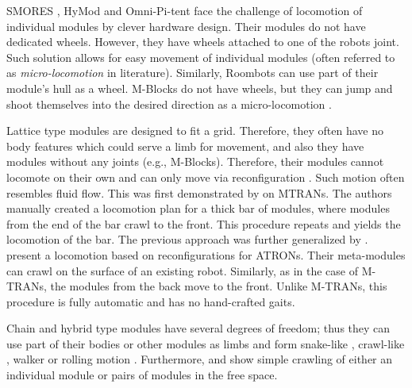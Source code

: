 SMORES \cite{DBLP:conf/iros/DaveyKY12}, HyMod \cite{DBLP:conf/dars/ParrottDG16}
and Omni-Pi-tent \cite{DBLP:conf/taros/PeckTT19} face the challenge of
locomotion of individual modules by clever hardware design. Their modules do not
have dedicated wheels. However, they have wheels attached to one of the robots
joint. Such solution allows for easy movement of individual modules (often
referred to as \emph{micro-locomotion} in literature). Similarly, Roombots
\cite{DBLP:conf/icra/SprowitzBDI09} can use part of their module's hull as a
wheel. M-Blocks do not have wheels, but they can jump and shoot themselves into
the desired direction as a micro-locomotion
\cite{DBLP:conf/icra/RomanishinGCR15}.

Lattice type modules are designed to fit a grid. Therefore, they often have no
body features which could serve a limb for movement, and also they have modules
without any joints (e.g., M-Blocks). Therefore, their modules cannot locomote on
their own and can only move via reconfiguration \cite{1285597}. Such motion
often resembles fluid flow. This was first demonstrated by
\textcite{DBLP:conf/iros/YoshidaMKTKK01} on MTRANs. The authors manually created
a locomotion plan for a thick bar of modules, where modules from the end of the
bar crawl to the front. This procedure repeats and yields the locomotion of the
bar. The previous approach was further generalized by
\textcite{DBLP:conf/icra/ButlerKRT02}.
\textcite{DBLP:conf/ieeealife/Christensen07} present a locomotion based on
reconfigurations for ATRONs. Their meta-modules can crawl on the surface of an
existing robot. Similarly, as in the case of M-TRANs, the modules from the back
move to the front. Unlike M-TRANs, this procedure is fully automatic and has no
hand-crafted gaits.

Chain and hybrid type modules have several degrees of freedom; thus they can use
part of their bodies or other modules as limbs and form snake-like
\cite{DBLP:conf/icra/YimDR00, DBLP:conf/iros/KamimuraMYKTK01,
DBLP:journals/ijrr/KurokawaTKKHM08, DBLP:journals/arobots/JingTYK18}, crawl-like
\cite{DBLP:conf/icra/YimDR00, DBLP:conf/iros/KamimuraMYKTK01,
DBLP:journals/ijrr/KurokawaTKKHM08, DBLP:journals/arobots/JingTYK18}, walker
\cite{DBLP:conf/iros/KamimuraMYKTK01, DBLP:journals/ijrr/KurokawaTKKHM08,
mtranwalker} or rolling motion \cite{DBLP:journals/ijrr/KurokawaTKKHM08,
DBLP:journals/ijrr/SastraCY09, DBLP:journals/arobots/JingTYK18}. Furthermore,
\cite{DBLP:conf/iros/YimSSPDT07a} and \cite{DBLP:journals/ijrr/KurokawaTKKHM08}
show simple crawling of either an individual module or pairs of modules in the
free space.

